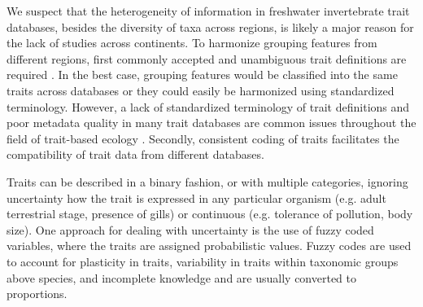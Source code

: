 \documentclass{article}
\begin{document}
We suspect that the heterogeneity of information in freshwater invertebrate trait databases, besides the diversity of taxa across regions, is likely a major reason for the lack of studies across continents. To harmonize grouping features from different regions, first commonly accepted and unambiguous trait definitions are required \cite{schneider_towards_2019}. In the best case, grouping features would be classified into the same traits across databases or they could easily be harmonized using standardized terminology. However, a lack of standardized terminology of trait definitions and poor metadata quality in many trait databases are common issues throughout the field of trait-based ecology \cite{baird_toward_2011, schneider_towards_2019}. Secondly, consistent coding of traits facilitates the compatibility of trait data from different databases. 

Traits can be described in a binary fashion, or with multiple categories, ignoring uncertainty how the trait is expressed in any particular organism (e.g. adult terrestrial stage, presence of gills) or continuous (e.g. tolerance of pollution, body size). One approach for dealing with uncertainty is the use of fuzzy coded variables, where the traits are assigned probabilistic values. Fuzzy codes are used to account for plasticity in traits, variability in traits within taxonomic groups above species, and incomplete knowledge and are usually converted to proportions. %
\end{document}
